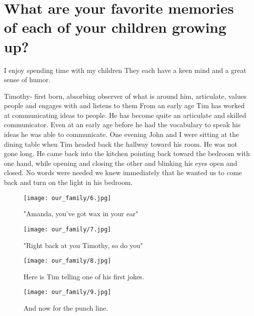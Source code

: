 \section{What are your favorite memories of each of your children growing up?}
I enjoy spending time with my children They each have a keen mind and a great sense of humor.

Timothy- first born, absorbing observer of what is around him, articulate, values people and engages with and listens to them
From an early age Tim has worked at communicating ideas to people.
He has become quite an articulate and skilled communicator.
Even at an early age before he had the vocabulary to speak his ideas he was able to communicate.
One evening John and I were sitting at the dining table when Tim headed back the hallway toward his room.
He was not gone long.
He came back into the kitchen pointing back toward the bedroom with one hand, while opening and closing the other and blinking his eyes open and closed.
No words were needed we knew immediately that he wanted us to come back and turn on the light in his bedroom.
\begin{figure}
\centering
\texttt{[image: our\_family/6.jpg]}
\caption{
"Amanda, you've got wax in your ear"
}
\end{figure}

\begin{figure}
\centering
\texttt{[image: our\_family/7.jpg]}
\caption{
"Right back at you Timothy, so do you"
}
\end{figure}

\begin{figure}
\centering
\texttt{[image: our\_family/8.jpg]}
\caption{
Here is Tim telling one of his first jokes.
}
\end{figure}

\begin{figure}
\centering
\texttt{[image: our\_family/9.jpg]}
\caption{
And now for the punch line.
}
\end{figure}


